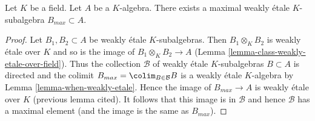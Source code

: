 \begin{lemma}
\label{lemma-max-weakly-etale-subalgebra}
Let $K$ be a field. Let $A$ be a $K$-algebra. There exists
a maximal weakly \'etale $K$-subalgebra $B_{max} \subset A$.
\end{lemma}

\begin{proof}
Let $B_1, B_2 \subset A$ be weakly \'etale $K$-subalgebras.
Then $B_1 \otimes_K B_2$ is weakly \'etale over $K$
and so is the image of $B_1 \otimes_K B_2 \to A$
(Lemma \ref{lemma-class-weakly-etale-over-field}).
Thus the collection $\mathcal{B}$ of weakly \'etale $K$-subalgebras
$B \subset A$ is directed and the colimit
$B_{max} = \colim_{B \in \mathcal{B}} B$ is
a weakly \'etale $K$-algebra by Lemma \ref{lemma-when-weakly-etale}.
Hence the image of $B_{max} \to A$ is weakly \'etale over $K$
(previous lemma cited). It follows that this image is in $\mathcal{B}$
and hence $\mathcal{B}$ has a maximal element
(and the image is the same as $B_{max}$).
\end{proof}
